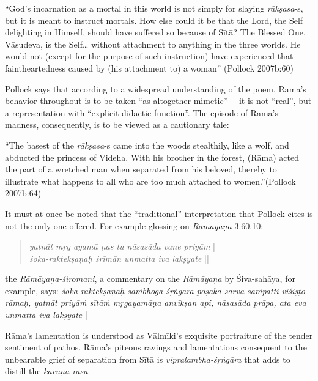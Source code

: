 \begin{myquote}
“God's incarnation as a mortal in this world is not simply for slaying {\sl rākṣasa}-s, but it is meant to instruct mortals. How else could it be that the Lord, the Self delighting in Himself, should have suffered so because of Sītā? The Blessed One, Vāsudeva, is the Self… without attachment to anything in the three worlds. He would not (except for the purpose of such instruction) have experienced that faintheartedness caused by (his attachment to) a woman” (Pollock 2007b:60)
\end{myquote}

Pollock says that according to a widespread understanding of the poem, Rāma’s behavior throughout is to be taken “as altogether mimetic”--- it is not “real”, but a representation with “explicit didactic function”. The episode of Rāma’s madness, consequently, is to be viewed as a cautionary tale: 

\newpage

\begin{myquote}
“The basest of the {\sl rākṣasa}-s came into the woods stealthily, like a wolf, and abducted the princess of Videha. With his brother in the forest, (Rāma) acted the part of a wretched man when separated from his beloved, thereby to illustrate what happens to all who are too much attached to women.”\hfill (Pollock 2007b:64)
\end{myquote}

It must at once be noted that the “traditional” interpretation that Pollock cites is not the only one offered. For example glossing on {\sl Rāmāyaṇa} 3.60.10:\\[-20pt] 
\begin{quote}
{{\sl yatnāt mṛg ayamā ṇas tu nāsasāda vane priyām}} |\\
{\sl śoka-raktekṣaṇaḥ śrīmān unmatta iva lakṣyate} ||\\[-20pt]  
\end{quote}
the {\sl Rāmāyaṇa-śiromaṇi}, a commentary on the {\sl Rāmāyaṇa} by Śiva-sahāya, for example, says: {\sl śoka-raktekṣaṇaḥ saṁbhoga-śṛṅgāra-poṣaka-sarva-saṁpatti-viśiṣṭo rāmaḥ, yatnāt priyāṁ sītāṁ mṛgaya\-māṇa anvīkṣan api, nāsasāda prāpa, ata eva unmatta iva lakṣyate} |  

Rāma’s lamentation is understood as Vālmīki’s exquisite portraiture of the tender sentiment of pathos. Rāma’s piteous ravings and lamentations consequent to the unbearable grief of separation from Sītā is {\sl vipralambha-śṛṅgāra} that adds to distill the {\sl karuṇa rasa}. 

